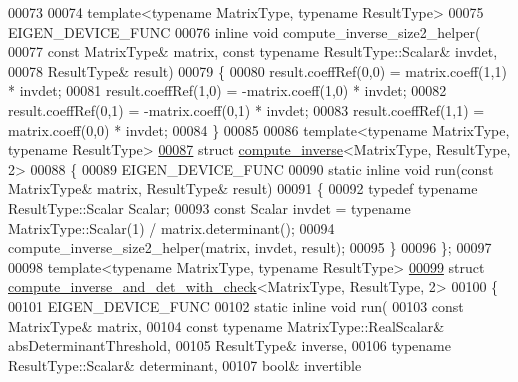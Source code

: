 \begin{DoxyCode}
00073 
00074 \textcolor{keyword}{template}<\textcolor{keyword}{typename} MatrixType, \textcolor{keyword}{typename} ResultType>
00075 EIGEN\_DEVICE\_FUNC 
00076 \textcolor{keyword}{inline} \textcolor{keywordtype}{void} compute\_inverse\_size2\_helper(
00077     \textcolor{keyword}{const} MatrixType& matrix, \textcolor{keyword}{const} \textcolor{keyword}{typename} ResultType::Scalar& invdet,
00078     ResultType& result)
00079 \{
00080   result.coeffRef(0,0) =  matrix.coeff(1,1) * invdet;
00081   result.coeffRef(1,0) = -matrix.coeff(1,0) * invdet;
00082   result.coeffRef(0,1) = -matrix.coeff(0,1) * invdet;
00083   result.coeffRef(1,1) =  matrix.coeff(0,0) * invdet;
00084 \}
00085 
00086 \textcolor{keyword}{template}<\textcolor{keyword}{typename} MatrixType, \textcolor{keyword}{typename} ResultType>
\hyperlink{struct_eigen_1_1internal_1_1compute__inverse_3_01_matrix_type_00_01_result_type_00_012_01_4}{00087} \textcolor{keyword}{struct }\hyperlink{struct_eigen_1_1internal_1_1compute__inverse}{compute\_inverse}<MatrixType, ResultType, 2>
00088 \{
00089   EIGEN\_DEVICE\_FUNC
00090   \textcolor{keyword}{static} \textcolor{keyword}{inline} \textcolor{keywordtype}{void} run(\textcolor{keyword}{const} MatrixType& matrix, ResultType& result)
00091   \{
00092     \textcolor{keyword}{typedef} \textcolor{keyword}{typename} ResultType::Scalar Scalar;
00093     \textcolor{keyword}{const} Scalar invdet = \textcolor{keyword}{typename} MatrixType::Scalar(1) / matrix.determinant();
00094     compute\_inverse\_size2\_helper(matrix, invdet, result);
00095   \}
00096 \};
00097 
00098 \textcolor{keyword}{template}<\textcolor{keyword}{typename} MatrixType, \textcolor{keyword}{typename} ResultType>
\hyperlink{struct_eigen_1_1internal_1_1compute__inverse__and__det__with__check_3_01_matrix_type_00_01_result_type_00_012_01_4}{00099} \textcolor{keyword}{struct }\hyperlink{struct_eigen_1_1internal_1_1compute__inverse__and__det__with__check}{compute\_inverse\_and\_det\_with\_check}<MatrixType, ResultType, 2>
00100 \{
00101   EIGEN\_DEVICE\_FUNC
00102   \textcolor{keyword}{static} \textcolor{keyword}{inline} \textcolor{keywordtype}{void} run(
00103     \textcolor{keyword}{const} MatrixType& matrix,
00104     \textcolor{keyword}{const} \textcolor{keyword}{typename} MatrixType::RealScalar& absDeterminantThreshold,
00105     ResultType& inverse,
00106     \textcolor{keyword}{typename} ResultType::Scalar& determinant,
00107     \textcolor{keywordtype}{bool}& invertible

\end{DoxyCode}
